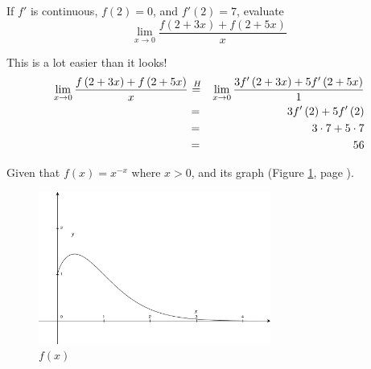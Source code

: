 \documentclass[12pt,addpoints, answers, fleqn]{exam}
\newcommand*\Heq{\ensuremath{\overset{\kern2pt H}{=}}}
\begin{document}
\begin{questions}
\question If $f'$ is continuous, $f\left(2\right)=0$, and $f'\left(2\right)=7$, evaluate
\[
\mathop {\lim }\limits_{ x \to 0} \frac{f\left(2+3x\right) + f\left(2+5x\right)}{x}
\]
\begin{solution}
This is a lot easier than it looks!
\begin{eqnarray*}
\lim_{ x \to 0} \frac{f\left(2+3x\right) + f\left(2+5x\right)}{x}  &\Heq& \lim_{ x \to 0} \frac{3 f'\left(2+3x\right) + 5 f'\left(2+5x\right)}{1} \\
&=& 3 f'\left(2\right) + 5 f'\left(2\right)\\
&=& 3 \cdot 7 + 5 \cdot 7\\
&=& 56
\end{eqnarray*}
\end{solution}

\question Given that $f\left(x\right) = x^{-x}$ where $x>0$, and its graph (Figure \ref{fig:2204}, page \pageref{fig:2204}).
\begin{figure}[htbp] %
   \centering
   \includegraphics[width=3in]{./graphics/graph2204.pdf} 
   \caption{$f\left(x\right)$}
   \label{fig:2204}
\end{figure}

\end{questions}
\end{document}
